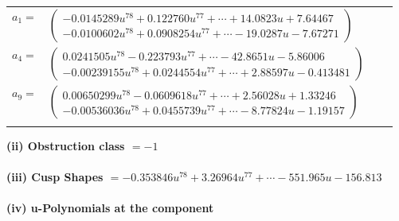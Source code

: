 \documentclass[1p]{elsarticle_modified}
\theoremstyle{definition}
\begin{document}
\begin{tabular}{m{7pt} m{180pt} m{7pt} m{180pt} }
\flushright $a_{1}=$&$\begin{pmatrix}-0.0145289 u^{78}+0.122760 u^{77}+\cdots+14.0823 u+7.64467\\-0.0100602 u^{78}+0.0908254 u^{77}+\cdots-19.0287 u-7.67271\end{pmatrix}$ \\
\flushright $a_{4}=$&$\begin{pmatrix}0.0241505 u^{78}-0.223793 u^{77}+\cdots-42.8651 u-5.86006\\-0.00239155 u^{78}+0.0244554 u^{77}+\cdots+2.88597 u-0.413481\end{pmatrix}$ \\
\flushright $a_{9}=$&$\begin{pmatrix}0.00650299 u^{78}-0.0609618 u^{77}+\cdots+2.56028 u+1.33246\\-0.00536036 u^{78}+0.0455739 u^{77}+\cdots-8.77824 u-1.19157\end{pmatrix}$\\&\end{tabular}
\flushleft \textbf{(ii) Obstruction class $= -1$}\\~\\
\flushleft \textbf{(iii) Cusp Shapes $= -0.353846 u^{78}+3.26964 u^{77}+\cdots-551.965 u-156.813$}\\~\\
\newpage\renewcommand{\arraystretch}{1}
\flushleft \textbf{(iv) u-Polynomials at the component}\newline \\
\end{document}
